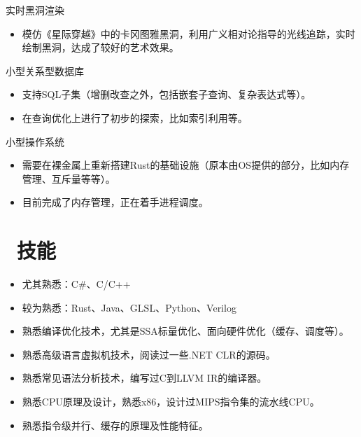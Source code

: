 \documentclass{resume}
\begin{document}
实时黑洞渲染
\begin{itemize}
  \item 模仿《星际穿越》中的卡冈图雅黑洞，利用广义相对论指导的光线追踪，实时绘制黑洞，达成了较好的艺术效果。
\end{itemize}

小型关系型数据库
\begin{itemize}
  \item 支持SQL子集（增删改查之外，包括嵌套子查询、复杂表达式等）。
  \item 在查询优化上进行了初步的探索，比如索引利用等。
\end{itemize}

小型操作系统
\begin{itemize}
  \item 需要在裸金属上重新搭建Rust的基础设施（原本由OS提供的部分，比如内存管理、互斥量等等）。
  \item 目前完成了内存管理，正在着手进程调度。
\end{itemize}


\section{\faCogs\ 技能}

\begin{itemize}
  \item 尤其熟悉：C\#、C/C++
  \item 较为熟悉：Rust、Java、GLSL、Python、Verilog
\end{itemize}

\begin{itemize}
  \item 熟悉编译优化技术，尤其是SSA标量优化、面向硬件优化（缓存、调度等）。
  \item 熟悉高级语言虚拟机技术，阅读过一些.NET CLR的源码。
  \item 熟悉常见语法分析技术，编写过C到LLVM IR的编译器。
\end{itemize}

\begin{itemize}
  \item 熟悉CPU原理及设计，熟悉x86，设计过MIPS指令集的流水线CPU。
  \item 熟悉指令级并行、缓存的原理及性能特征。
\end{itemize}


  
\end{document}

